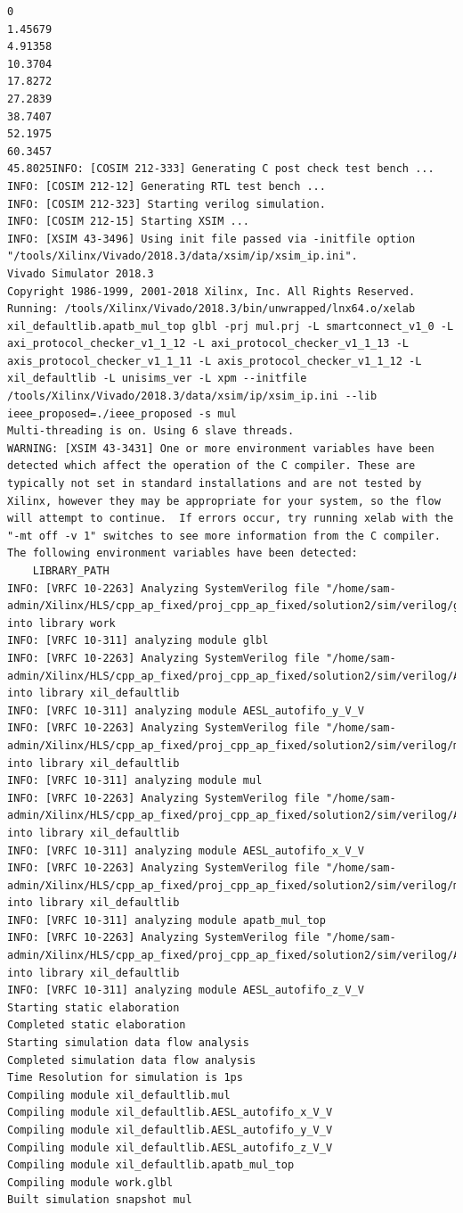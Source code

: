 \documentclass{article}
\begin{document}
\begin{lstlisting}
0
1.45679
4.91358
10.3704
17.8272
27.2839
38.7407
52.1975
60.3457
45.8025INFO: [COSIM 212-333] Generating C post check test bench ...
INFO: [COSIM 212-12] Generating RTL test bench ...
INFO: [COSIM 212-323] Starting verilog simulation. 
INFO: [COSIM 212-15] Starting XSIM ...
INFO: [XSIM 43-3496] Using init file passed via -initfile option "/tools/Xilinx/Vivado/2018.3/data/xsim/ip/xsim_ip.ini".
Vivado Simulator 2018.3
Copyright 1986-1999, 2001-2018 Xilinx, Inc. All Rights Reserved.
Running: /tools/Xilinx/Vivado/2018.3/bin/unwrapped/lnx64.o/xelab xil_defaultlib.apatb_mul_top glbl -prj mul.prj -L smartconnect_v1_0 -L axi_protocol_checker_v1_1_12 -L axi_protocol_checker_v1_1_13 -L axis_protocol_checker_v1_1_11 -L axis_protocol_checker_v1_1_12 -L xil_defaultlib -L unisims_ver -L xpm --initfile /tools/Xilinx/Vivado/2018.3/data/xsim/ip/xsim_ip.ini --lib ieee_proposed=./ieee_proposed -s mul 
Multi-threading is on. Using 6 slave threads.
WARNING: [XSIM 43-3431] One or more environment variables have been detected which affect the operation of the C compiler. These are typically not set in standard installations and are not tested by Xilinx, however they may be appropriate for your system, so the flow will attempt to continue.  If errors occur, try running xelab with the "-mt off -v 1" switches to see more information from the C compiler. The following environment variables have been detected:
    LIBRARY_PATH
INFO: [VRFC 10-2263] Analyzing SystemVerilog file "/home/sam-admin/Xilinx/HLS/cpp_ap_fixed/proj_cpp_ap_fixed/solution2/sim/verilog/glbl.v" into library work
INFO: [VRFC 10-311] analyzing module glbl
INFO: [VRFC 10-2263] Analyzing SystemVerilog file "/home/sam-admin/Xilinx/HLS/cpp_ap_fixed/proj_cpp_ap_fixed/solution2/sim/verilog/AESL_autofifo_y_V_V.v" into library xil_defaultlib
INFO: [VRFC 10-311] analyzing module AESL_autofifo_y_V_V
INFO: [VRFC 10-2263] Analyzing SystemVerilog file "/home/sam-admin/Xilinx/HLS/cpp_ap_fixed/proj_cpp_ap_fixed/solution2/sim/verilog/mul.v" into library xil_defaultlib
INFO: [VRFC 10-311] analyzing module mul
INFO: [VRFC 10-2263] Analyzing SystemVerilog file "/home/sam-admin/Xilinx/HLS/cpp_ap_fixed/proj_cpp_ap_fixed/solution2/sim/verilog/AESL_autofifo_x_V_V.v" into library xil_defaultlib
INFO: [VRFC 10-311] analyzing module AESL_autofifo_x_V_V
INFO: [VRFC 10-2263] Analyzing SystemVerilog file "/home/sam-admin/Xilinx/HLS/cpp_ap_fixed/proj_cpp_ap_fixed/solution2/sim/verilog/mul.autotb.v" into library xil_defaultlib
INFO: [VRFC 10-311] analyzing module apatb_mul_top
INFO: [VRFC 10-2263] Analyzing SystemVerilog file "/home/sam-admin/Xilinx/HLS/cpp_ap_fixed/proj_cpp_ap_fixed/solution2/sim/verilog/AESL_autofifo_z_V_V.v" into library xil_defaultlib
INFO: [VRFC 10-311] analyzing module AESL_autofifo_z_V_V
Starting static elaboration
Completed static elaboration
Starting simulation data flow analysis
Completed simulation data flow analysis
Time Resolution for simulation is 1ps
Compiling module xil_defaultlib.mul
Compiling module xil_defaultlib.AESL_autofifo_x_V_V
Compiling module xil_defaultlib.AESL_autofifo_y_V_V
Compiling module xil_defaultlib.AESL_autofifo_z_V_V
Compiling module xil_defaultlib.apatb_mul_top
Compiling module work.glbl
Built simulation snapshot mul



\end{lstlisting}
\end{document}
